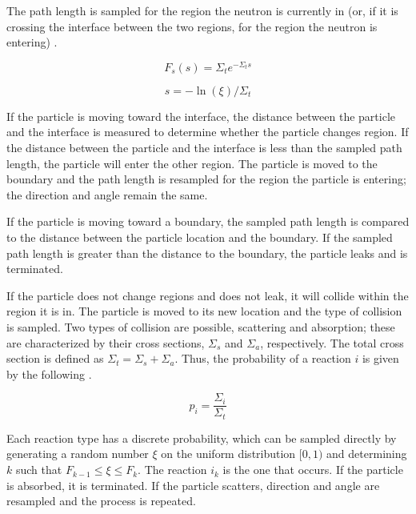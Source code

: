 \documentclass[11pt, oneside]{article}   	%
\begin{document}
The path length is sampled for the region the neutron is currently in (or, if it is crossing the interface between the two regions, for the region the neutron is entering) \cite{NE250_notes_2}.
 
\begin{equation}
F_s(s)=\Sigma_t e^{-\Sigma_ts}
\end{equation}

\begin{equation}
s = -\ln(\xi)/\Sigma_t
\end{equation}

If the particle is moving toward the interface, the distance between the particle and the interface is measured to determine whether the particle changes region. If the distance between the particle and the interface is less than the sampled path length, the particle will enter the other region. The particle is moved to the boundary and the path length is resampled for the region the particle is entering; the direction and angle remain the same.

If the particle is moving toward a boundary, the sampled path length is compared to the distance between the particle location and the boundary. If the sampled path length is greater than the distance to the boundary, the particle leaks and is terminated. 

If the particle does not change regions and does not leak, it will collide within the region it is in. The particle is moved to its new location and the type of collision is sampled. Two types of collision are possible, scattering and absorption; these are characterized by their cross sections, $\Sigma_{s}$ and $\Sigma_{a}$, respectively. The total cross section is defined as $\Sigma_{t}=\Sigma_{s} + \Sigma_{a}$. Thus, the probability of a reaction $i$ is given by the following \cite{NE250_notes_2}.

\begin{equation}
p_{i} = \frac{\Sigma_{i}}{\Sigma_{t}}
\end{equation}

Each reaction type has a discrete probability, which can be sampled directly by generating a random number $\xi$ on the uniform distribution $[0,1)$ and determining $k$ such that $F_{k-1} \leq \xi \leq F_{k}$. The reaction $i_{k}$ is the one that occurs. If the particle is absorbed, it is terminated. If the particle scatters, direction and angle are resampled and the process is repeated.
\end{document}
